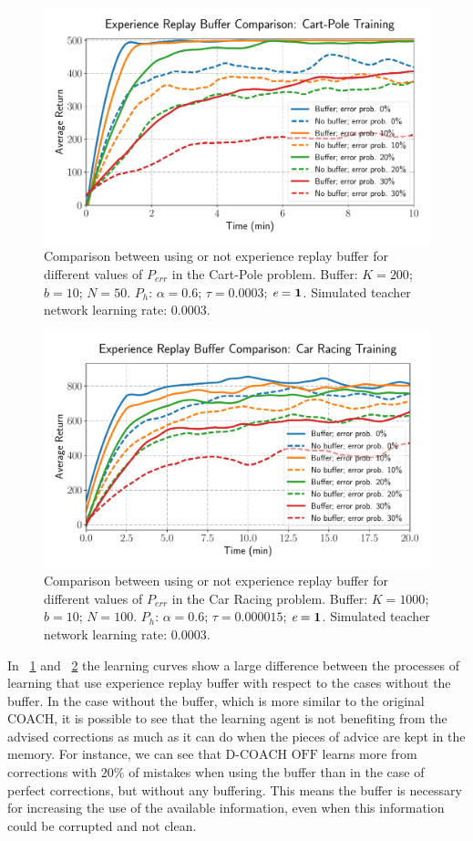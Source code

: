 \begin{figure}[h]
    \centering
    \includegraphics[width=0.8\linewidth]{imagenes/cap3/buffer_cart_pole.pdf}
    \caption{Comparison between using or not experience replay buffer for different values of $P_\mathit{err}$ in the Cart-Pole problem. Buffer: $K = 200$; $b = 10$; $N = 50$. $P_{h}$: $\alpha = 0.6$; $\tau = 0.0003$; $\emph{e}=\textbf{1}$. Simulated teacher network learning rate: $0.0003$.}
    \label{fig:buffer_cart_pole}
\end{figure}

\begin{figure}[h]
    \centering
    \includegraphics[width=0.8\linewidth]{imagenes/cap3/bufferCarRacing.pdf}
    \caption{Comparison between using or not experience replay buffer for different values of $P_\mathit{err}$ in the Car Racing problem. Buffer: $K = 1000$; $b = 10$; $N = 100$. $P_{h}$: $\alpha = 0.6$; $\tau = 0.000015$; $\emph{e}=\textbf{1}$. Simulated teacher network learning rate: $0.0003$.}
    \label{fig:buffer_car_racing}
\end{figure}

In \figurename~{\ref{fig:buffer_cart_pole}} and \figurename~{\ref{fig:buffer_car_racing}} the learning curves show a large difference between the processes of learning that use experience replay buffer with respect to the cases without the buffer. In the case without the buffer, which is more similar to the original COACH, it is possible to see that the learning agent is not benefiting from the advised corrections as much as it can do when the pieces of advice are kept in the memory. For instance, we can see that $\text{D-COACH OFF}$ learns more from corrections with $20 \%$ of mistakes when using the buffer than in the case of perfect corrections, but without any buffering. This means the buffer is necessary for increasing the use of the available information, even when this information could be corrupted and not clean.

